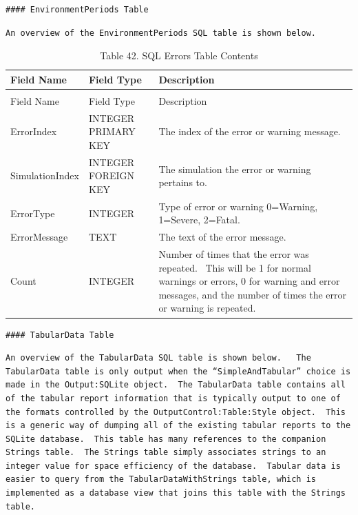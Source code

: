 \begin{lstlisting}
#### EnvironmentPeriods Table
\end{lstlisting}

\begin{lstlisting}
An overview of the EnvironmentPeriods SQL table is shown below.
\end{lstlisting}

\begin{longtable}[c]{p{1.5in}p{1.5in}p{2.99in}}
\caption{Table 42. SQL Errors Table Contents \label{table:table-42.-sql-errors-table-contents}} \tabularnewline
\toprule 
Field Name & Field Type & Description \tabularnewline
\midrule
\endfirsthead

\caption[]{Table 42. SQL Errors Table Contents} \tabularnewline
\toprule 
Field Name & Field Type & Description \tabularnewline
\midrule
\endhead

ErrorIndex & INTEGER PRIMARY KEY & The index of the error or warning message. \tabularnewline
SimulationIndex & INTEGER FOREIGN KEY & The simulation the error or warning pertains to. \tabularnewline
ErrorType & INTEGER & Type of error or warning 0=Warning, 1=Severe, 2=Fatal. \tabularnewline
ErrorMessage & TEXT & The text of the error message. \tabularnewline
Count & INTEGER & Number of times that the error was repeated.~ This will be 1 for normal warnings or errors, 0 for warning and error messages, and the number of times the error or warning is repeated. \tabularnewline
\bottomrule
\end{longtable}

\begin{lstlisting}
#### TabularData Table
\end{lstlisting}

\begin{lstlisting}
An overview of the TabularData SQL table is shown below.   The TabularData table is only output when the “SimpleAndTabular” choice is made in the Output:SQLite object.  The TabularData table contains all of the tabular report information that is typically output to one of the formats controlled by the OutputControl:Table:Style object.  This is a generic way of dumping all of the existing tabular reports to the SQLite database.  This table has many references to the companion Strings table.  The Strings table simply associates strings to an integer value for space efficiency of the database.  Tabular data is easier to query from the TabularDataWithStrings table, which is implemented as a database view that joins this table with the Strings table.
\end{lstlisting}

